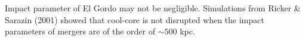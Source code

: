 Impact parameter of El Gordo may not be negligible. 
Simulations from Ricker \& Sarazin (2001) showed that cool-core is not
disrupted  when the impact parameters of mergers are of the order of $\sim 500$ kpc.   


